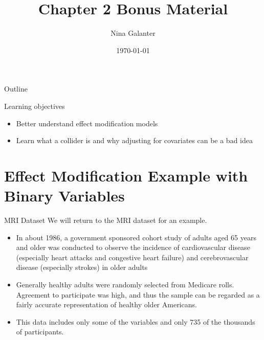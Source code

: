 \documentclass[10pt,t]{beamer}
\title{Chapter 2 Bonus Material}
\author{Nina Galanter}
\date{\today}
\begin{document}
	\begin{frame}
	\titlepage 
\end{frame}

\begin{frame}{Outline}
	\tableofcontents
\end{frame}


\begin{frame}{Learning objectives}
	\begin{itemize}
		\item Better understand effect modification models
		\medskip
		\item Learn what a collider is and why adjusting for covariates can be a bad idea
	\end{itemize}
\end{frame}

\section{Effect Modification Example with Binary Variables}

\begin{frame}{MRI Dataset}
	We will return to the MRI dataset for an example.
	\medskip
	
	\begin{itemize}
		\item In about 1986, a government sponsored cohort study of adults aged 65 years and older was conducted to observe the incidence of cardiovascular disease (especially heart attacks and congestive heart failure) and cerebrovascular disease (especially strokes) in older adults
		\medskip
		
		\item Generally healthy adults were randomly selected from Medicare rolls. Agreement to participate was high, and thus the sample can be regarded as a fairly accurate representation of healthy older Americans. 
		\medskip
		
		\item  This data includes only some of the variables and only 735 of the thousands of participants.
		
	\end{itemize}
	
\end{frame}
\end{document}
